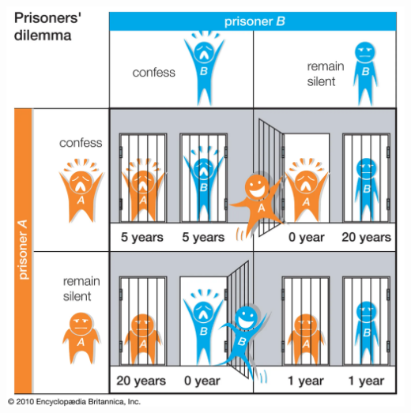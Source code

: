 \begin{frame}
    \centering
    
    \includegraphics[height=.9\textheight]{Bin/prisonersdilemma.PNG}

\end{frame}



